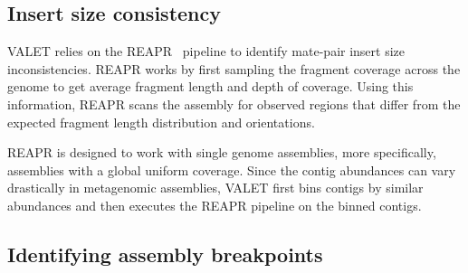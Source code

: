 \documentclass{bioinfo}
\begin{document}
\subsection{Insert size consistency}


VALET relies on the REAPR~\citep{hunt2013reapr} pipeline to identify mate-pair insert size inconsistencies.  REAPR works by first sampling the fragment coverage across the genome to get average fragment length and depth of coverage.  Using this information, REAPR scans the assembly for observed regions that differ from the expected fragment length distribution and orientations.

REAPR is designed to work with single genome assemblies, more specifically, assemblies with a global uniform coverage.  Since the contig abundances can vary drastically in metagenomic assemblies, VALET first bins contigs by similar abundances and then executes the REAPR pipeline on the binned contigs.

\subsection{Identifying assembly breakpoints}
\end{document}
